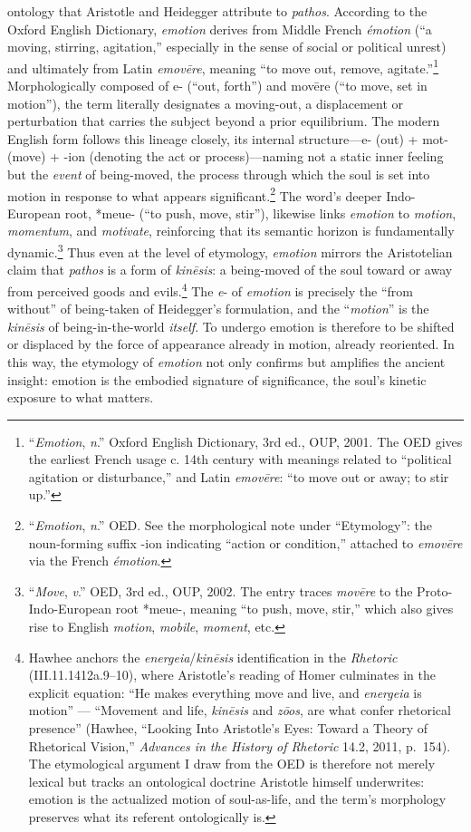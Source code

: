 \documentclass{article}
\begin{document}
ontology that Aristotle and Heidegger attribute to \textit{pathos}. According to the Oxford English Dictionary, \textit{emotion} derives from Middle French \textit{émotion} (“a moving, stirring, agitation,” especially in the sense of social or political unrest) and ultimately from Latin \textit{emovēre}, meaning “to move out, remove, agitate.”\footnote{“\textit{Emotion}, \textit{n}.” Oxford English Dictionary, 3rd ed., OUP, 2001. The OED gives the earliest French usage c. 14th century with meanings related to “political agitation or disturbance,” and Latin \textit{emovēre}: “to move out or away; to stir up.”} Morphologically composed of e- (“out, forth”) and movēre (“to move, set in motion”), the term literally designates a moving-out, a displacement or perturbation that carries the subject beyond a prior equilibrium. The modern English form follows this lineage closely, its internal structure—e- (out) + mot- (move) + -ion (denoting the act or process)—naming not a static inner feeling but the \textit{event} of being-moved, the process through which the soul is set into motion in response to what appears significant.\footnote{“\textit{Emotion}, \textit{n}.” OED. See the morphological note under “Etymology”: the noun-forming suffix -ion indicating “action or condition,” attached to \textit{emovēre} via the French \textit{émotion}.} The word’s deeper Indo-European root, *meue- (“to push, move, stir”), likewise links \textit{emotion} to \textit{motion}, \textit{momentum}, and \textit{motivate}, reinforcing that its semantic horizon is fundamentally dynamic.\footnote{“\textit{Move}, \textit{v}.” OED, 3rd ed., OUP, 2002. The entry traces \textit{movēre} to the Proto-Indo-European root *meue-, meaning “to push, move, stir,” which also gives rise to English \textit{motion}, \textit{mobile}, \textit{moment}, etc.}  Thus even at the level of etymology, \textit{emotion} mirrors the Aristotelian claim that \textit{pathos} is a form of \textit{kinēsis}: a being-moved of the soul toward or away from perceived goods and evils.\footnote{Hawhee anchors the \textit{energeia}/\textit{kinēsis} identification in the \textit{Rhetoric} (III.11.1412a.9--10), where Aristotle's reading of Homer culminates in the explicit equation: ``He makes everything move and live, and \textit{energeia} is motion'' --- ``Movement and life, \textit{kinēsis} and \textit{zōos}, are what confer rhetorical presence'' (Hawhee, ``Looking Into Aristotle's Eyes: Toward a Theory of Rhetorical Vision,'' \textit{Advances in the History of Rhetoric} 14.2, 2011, p.~154). The etymological argument I draw from the OED is therefore not merely lexical but tracks an ontological doctrine Aristotle himself underwrites: emotion is the actualized motion of soul-as-life, and the term's morphology preserves what its referent ontologically is.} The \textit{e}- of \textit{emotion} is precisely the ``from without'' of being-taken of Heidegger's formulation, and the ``\textit{motion}'' is the \textit{kinēsis} of being-in-the-world \textit{itself}. To undergo emotion is therefore to be shifted or displaced by the force of appearance already in motion, already reoriented. In this way, the etymology of \textit{emotion} not only confirms but amplifies the ancient insight: emotion is the embodied signature of significance, the soul’s kinetic exposure to what matters. 
\end{document}
